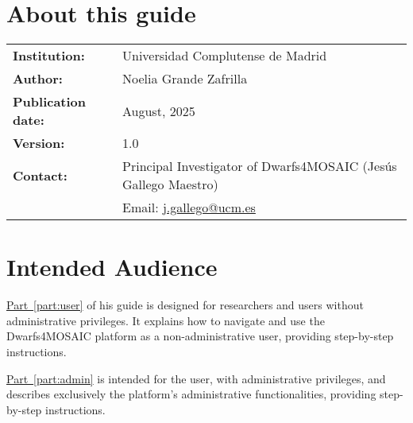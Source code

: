 



\newcommand{\project}{\textsf{Dwarfs4MOSAIC}\xspace}
\newcommand{\prjInstitution}{Universidad Complutense de Madrid}
\newcommand{\prjAuthor}{Noelia Grande Zafrilla}
\newcommand{\prjPubDate}{August, 2025} %
\newcommand{\prjVersion}{1.0}
\newcommand{\prjContact}{Principal Investigator of Dwarfs4MOSAIC (Jesús Gallego Maestro)}
\newcommand{\prjMail}{j.gallego@ucm.es}



	\pagestyle{empty}   %
	
	
	
	\setlength{\parskip}{1em}    %
	\setlength{\parindent}{0pt}  %
	
	\section*{About this guide}
	
	\begin{flushleft}
		\begin{tabular}{ll}
			\textbf{Institution:} & \prjInstitution \\
			\textbf{Author:} & \prjAuthor \\
			\textbf{Publication date:} & \prjPubDate \\
			\textbf{Version:} & 1.0 \\
			\textbf{Contact:} & \prjContact \\
			& Email: \href{mailto:\prjMail}{\prjMail}
		\end{tabular}
	\end{flushleft}
	
	\vspace{2cm}
	
	\section*{Intended Audience}
	
	\hyperref[part:user]{Part~\ref*{part:user}} of his guide is designed for researchers and users without administrative privileges. It explains how to navigate and use the \project platform as a non-administrative user, providing step-by-step instructions.
	
	\hyperref[part:admin]{Part~\ref*{part:admin}} is intended for the \admin user, with administrative privileges, and describes exclusively the platform’s administrative functionalities, providing step-by-step instructions.
	 
